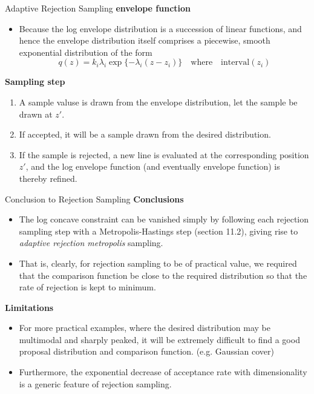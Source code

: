 \documentclass{bredelebeamer}
\begin{document}
\begin{frame}{Adaptive Rejection Sampling}
  \textbf{envelope function}\\
  \begin{itemize}
    \item Because the log envelope distribution is a succession of linear functions,
    and hence the envelope distribution itself comprises a piecewise, smooth
    exponential distribution of the form
    \begin{equation}
      q(z) = k_i\lambda_i \exp {\{ -\lambda_i (z - z_i) \}}
      \quad \textrm{where} \quad \textrm{interval}(z_i)
    \end{equation}
  \end{itemize}

  \textbf{Sampling step} \\
  \begin{enumerate}
    \item A sample valuse is drawn from the envelope distribution, let the
    sample be drawn at $z'$.
    \item If accepted, it will be a sample drawn from the desired distribution.
    \item If the sample is rejected, a new line is evaluated at the
    corresponding position $z'$, and the log envelope function (and
    eventually envelope function) is thereby refined.
  \end{enumerate}
\end{frame}

\begin{frame}{Conclusion to Rejection Sampling}
  \textbf{Conclusions} \\
  \begin{itemize}
    \item The log concave constraint can be vanished simply by following
    each rejection sampling step with a Metropolis-Hastings step (section
    11.2), giving rise to \textit{adaptive rejection metropolis} sampling.
    \item That is, clearly, for rejection sampling to be of practical value,
    we required that the comparison function be close to the required
    distribution so that the rate of rejection is kept to minimum.
  \end{itemize}
  \textbf{Limitations} \\
  \begin{itemize}
    \item For more practical examples, where the desired distribution may be
    multimodal and sharply peaked, it will be extremely difficult to find
    a good proposal distribution and comparison function. (e.g. Gaussian cover)
    \item Furthermore, the exponential decrease of acceptance rate with
    dimensionality is a generic feature of rejection sampling.
  \end{itemize}
\end{frame}
\end{document}

